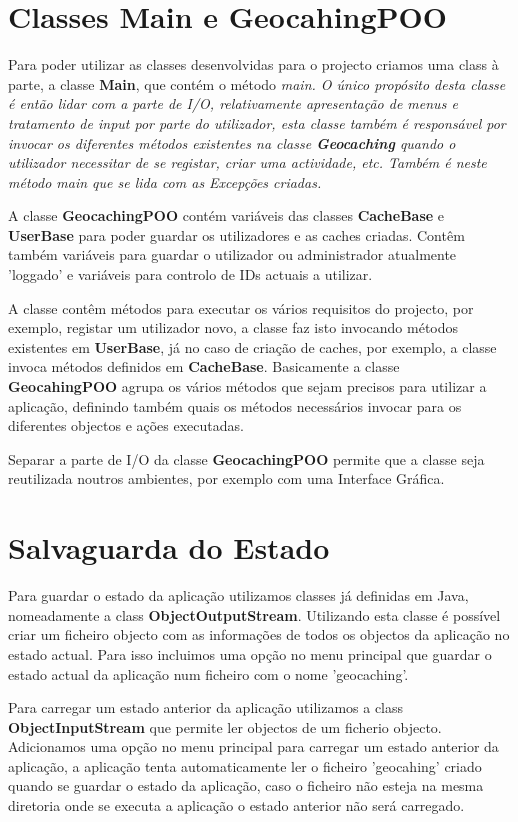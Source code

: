 \documentclass{article}
\begin{document}
\pagebreak
\section{Classes Main e GeocahingPOO}
\par Para poder utilizar as classes desenvolvidas para o projecto criamos uma class à parte, a classe \textbf{Main}, que contém
o método \em main. O único propósito desta classe é então lidar com a parte de I/O, relativamente apresentação de menus
e tratamento de input por parte do utilizador, esta classe também é responsável por invocar os diferentes métodos existentes
na classe \textbf{Geocaching} quando o utilizador necessitar de se registar, criar uma actividade, etc.
Também é neste método \em main que se lida com as Excepções criadas.
\par A classe \textbf{GeocachingPOO} contém variáveis das classes \textbf{CacheBase} e \textbf{UserBase} para poder guardar
os utilizadores e as caches criadas. Contêm também variáveis para guardar o utilizador ou administrador atualmente 'loggado'
e variáveis para controlo de IDs actuais a utilizar.
\par A classe contêm métodos para executar os vários requisitos do projecto, por exemplo, registar um utilizador novo, a classe
faz isto invocando métodos existentes em \textbf{UserBase}, já no caso de criação de caches, por exemplo, a classe invoca
métodos definidos em \textbf{CacheBase}. Basicamente a classe \textbf{GeocahingPOO} agrupa os vários métodos que sejam
precisos para utilizar a aplicação, definindo também quais os métodos necessários invocar para os diferentes objectos e ações
executadas.
\par Separar a parte de I/O da classe \textbf{GeocachingPOO} permite que a classe seja reutilizada noutros ambientes, por
exemplo com uma Interface Gráfica.

\pagebreak
\section{Salvaguarda do Estado}
\par Para guardar o estado da aplicação utilizamos classes já definidas em Java, nomeadamente a class
\textbf{ObjectOutputStream}. Utilizando esta classe é possível criar um ficheiro objecto com as informações de todos os
objectos da aplicação no estado actual. Para isso incluimos uma opção no menu principal que guardar o estado actual
da aplicação num ficheiro com o nome 'geocaching'.
\par Para carregar um estado anterior da aplicação utilizamos a class \textbf{ObjectInputStream} que permite ler objectos de
um ficherio objecto. Adicionamos uma opção no menu principal para carregar um estado anterior da aplicação, a aplicação
tenta automaticamente ler o ficheiro 'geocahing' criado quando se guardar o estado da aplicação, caso o ficheiro não esteja
na mesma diretoria onde se executa a aplicação o estado anterior não será carregado.
\end{document}

